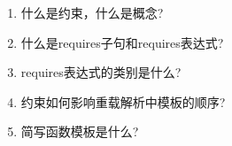 \begin{enumerate}
\item
什么是约束，什么是概念?

\item
什么是requires子句和requires表达式?

\item
requires表达式的类别是什么?

\item
约束如何影响重载解析中模板的顺序?

\item
简写函数模板是什么?
\end{enumerate}